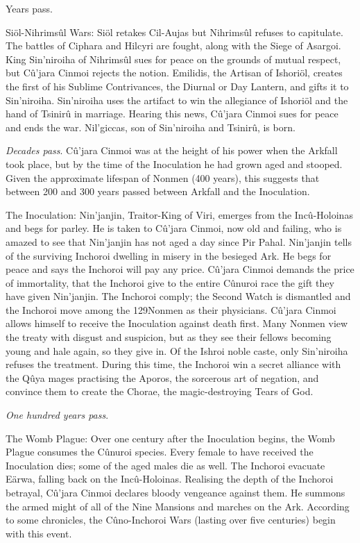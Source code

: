 \documentclass[]{book}
\begin{document}
Years pass.

Siöl-Nihrimsûl Wars: Siöl retakes Cil-Aujas but Nihrimsûl refuses to capitulate. The
battles of Ciphara and Hilcyri are fought, along with the Siege of Asargoi. King
Sin'niroiha of Nihrimsûl sues for peace on the grounds of mutual respect, but Cû'jara
Cinmoi rejects the notion. Emilidis, the Artisan of Ishoriöl, creates the first of his
Sublime Contrivances, the Diurnal or Day Lantern, and gifts it to Sin'niroiha.
Sin'niroiha uses the artifact to win the allegiance of Ishoriöl and the hand of Tsinirû in
marriage. Hearing this news, Cû'jara Cinmoi sues for peace and ends the war.
Nil'giccas, son of Sin'niroiha and Tsinirû, is born.

\emph{Decades pass}. Cû'jara Cinmoi was at the height of his power when the Arkfall took
place, but by the time of the Inoculation he had grown aged and stooped. Given the
approximate lifespan of Nonmen (400 years), this suggests that between 200 and 300
years passed between Arkfall and the Inoculation.

The Inoculation: Nin'janjin, Traitor-King of Viri, emerges from the Incû-Holoinas and
begs for parley. He is taken to Cû'jara Cinmoi, now old and failing, who is amazed to
see that Nin'janjin has not aged a day since Pir Pahal. Nin'janjin tells of the surviving
Inchoroi dwelling in misery in the besieged Ark. He begs for peace and says the
Inchoroi will pay any price. Cû'jara Cinmoi demands the price of immortality, that the
Inchoroi give to the entire Cûnuroi race the gift they have given Nin'janjin. The
Inchoroi comply; the Second Watch is dismantled and the Inchoroi move among the
129Nonmen as their physicians. Cû'jara Cinmoi allows himself to receive the Inoculation
against death first. Many Nonmen view the treaty with disgust and suspicion, but as
they see their fellows becoming young and hale again, so they give in. Of the Ishroi
noble caste, only Sin'niroiha refuses the treatment. During this time, the Inchoroi win
a secret alliance with the Qûya mages practising the Aporos, the sorcerous art of
negation, and convince them to create the Chorae, the magic-destroying Tears of God.

\emph{One hundred years pass}.

The Womb Plague: Over one century after the Inoculation begins, the Womb Plague
consumes the Cûnuroi species. Every female to have received the Inoculation dies;
some of the aged males die as well. The Inchoroi evacuate Eärwa, falling back on the
Incû-Holoinas. Realising the depth of the Inchoroi betrayal, Cû'jara Cinmoi declares
bloody vengeance against them. He summons the armed might of all of the Nine
Mansions and marches on the Ark. According to some chronicles, the Cûno-Inchoroi
Wars (lasting over five centuries) begin with this event.
\end{document}
